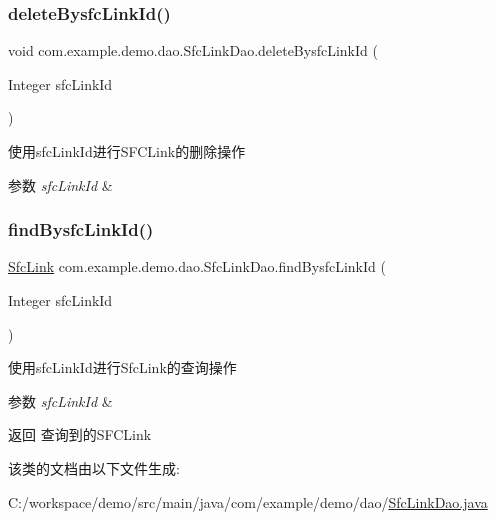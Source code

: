 \subsubsection{\texorpdfstring{delete\+Bysfc\+Link\+Id()}{deleteBysfcLinkId()}}
{\footnotesize\ttfamily void com.\+example.\+demo.\+dao.\+Sfc\+Link\+Dao.\+delete\+Bysfc\+Link\+Id (\begin{DoxyParamCaption}\item[{Integer}]{sfc\+Link\+Id }\end{DoxyParamCaption})}

使用sfc\+Link\+Id进行\+S\+F\+C\+Link的删除操作 
\begin{DoxyParams}{参数}
{\em sfc\+Link\+Id} & \\
\hline
\end{DoxyParams}
\mbox{\label{interfacecom_1_1example_1_1demo_1_1dao_1_1_sfc_link_dao_aab8d86062eea4a2c00038e4f3dd6887d}} 
\subsubsection{\texorpdfstring{find\+Bysfc\+Link\+Id()}{findBysfcLinkId()}}
{\footnotesize\ttfamily \mbox{\hyperlink{classcom_1_1example_1_1demo_1_1modular_1_1_sfc_link}{Sfc\+Link}} com.\+example.\+demo.\+dao.\+Sfc\+Link\+Dao.\+find\+Bysfc\+Link\+Id (\begin{DoxyParamCaption}\item[{Integer}]{sfc\+Link\+Id }\end{DoxyParamCaption})}

使用sfc\+Link\+Id进行\+Sfc\+Link的查询操作 
\begin{DoxyParams}{参数}
{\em sfc\+Link\+Id} & \\
\hline
\end{DoxyParams}
\begin{DoxyReturn}{返回}
查询到的\+S\+F\+C\+Link 
\end{DoxyReturn}


该类的文档由以下文件生成\+:\begin{DoxyCompactItemize}
\item 
C\+:/workspace/demo/src/main/java/com/example/demo/dao/\mbox{\hyperlink{_sfc_link_dao_8java}{Sfc\+Link\+Dao.\+java}}\end{DoxyCompactItemize}
